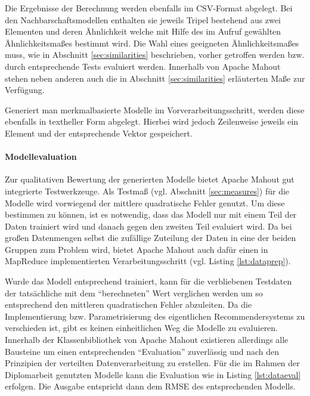   
 
 
Die Ergebnisse der Berechnung werden ebenfalls im CSV-Format abgelegt. Bei den Nachbarschaftsmodellen enthalten sie jeweils Tripel bestehend aus zwei Elementen und deren Ähnlichkeit welche mit Hilfe des im Aufruf gewählten Ähnlichkeitsmaßes bestimmt wird. Die Wahl eines geeigneten Ähnlichkeitsmaßes muss, wie in Abschnitt \ref{sec:similarities} beschrieben, vorher getroffen werden bzw. durch entsprechende Tests evaluiert werden. Innerhalb von Apache Mahout stehen neben anderen auch die in Abschnitt \ref{sec:similarities} erläuterten Maße zur Verfügung.

Generiert man merkmalbasierte Modelle im Vorverarbeitungsschritt, werden diese ebenfalls in textheller Form abgelegt. Hierbei wird jedoch Zeilenweise jeweils ein Element und der entsprechende Vektor gespeichert.

\paragraph{Modellevaluation} Zur qualitativen Bewertung der generierten Modelle bietet Apache Mahout gut integrierte Testwerkzeuge. Als Testmaß (vgl. Abschnitt \ref{sec:measures}) für die Modelle wird vorwiegend der mittlere quadratische Fehler genutzt. Um diese bestimmen zu können, ist es notwendig, dass das Modell nur mit einem Teil der Daten trainiert wird und danach gegen den zweiten Teil evaluiert wird. Da bei großen Datenmengen selbst die zufällige Zuteilung der Daten in eine der beiden Gruppen zum Problem wird, bietet Apache Mahout auch dafür einen in MapReduce implementierten Verarbeitungsschritt (vgl. Listing \ref{lst:dataprep}).



Wurde das Modell entsprechend trainiert, kann für die verbliebenen Testdaten der tatsächliche mit dem ``berechneten'' Wert verglichen werden um so entsprechend den mittleren quadratischen Fehler abzuleiten. Da die Implementierung bzw. Parametrisierung des eigentlichen Recommendersystems zu verschieden ist, gibt es keinen einheitlichen Weg die Modelle zu evaluieren. Innerhalb der Klassenbibliothek von Apache Mahout existieren allerdings alle Bausteine um einen entsprechenden ``Evaluation'' zuverlässig und nach den Prinzipien der verteilten Datenverarbeitung zu erstellen. Für die im Rahmen der Diplomarbeit genutzten Modelle kann die Evaluation wie in Listing \ref{lst:dataeval}  erfolgen. Die Ausgabe entspricht dann dem \acs{RMSE} des entsprechenden Modells. \citep{mia}

